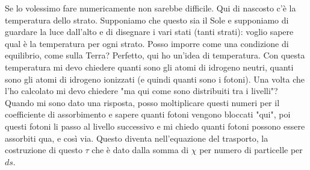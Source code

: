 Se lo volessimo fare numericamente non sarebbe difficile.
Qui di nascosto c'è la temperatura dello strato. Supponiamo che questo sia il Sole e supponiamo di guardare la luce dall'alto e di disegnare i vari stati (tanti strati): voglio sapere qual è la temperatura per ogni strato. Posso imporre come una condizione di equilibrio, come sulla Terra? Perfetto, qui ho un'idea di temperatura. Con questa temperatura mi devo chiedere quanti sono gli atomi di idrogeno neutri, quanti sono gli atomi di idrogeno ionizzati (e quindi quanti sono i fotoni). Una volta che l'ho calcolato mi devo chiedere "ma qui come sono distribuiti tra i livelli"? Quando mi sono dato una risposta, posso moltiplicare questi numeri per il coefficiente di assorbimento e sapere quanti fotoni vengono bloccati "qui", poi questi fotoni li passo al livello successivo e mi chiedo quanti fotoni possono essere assorbiti qua, e così via.
Questo diventa nell'equazione del trasporto, la costruzione di questo $\tau$ che è dato dalla somma di $\chi$ per numero di particelle per $ds$.